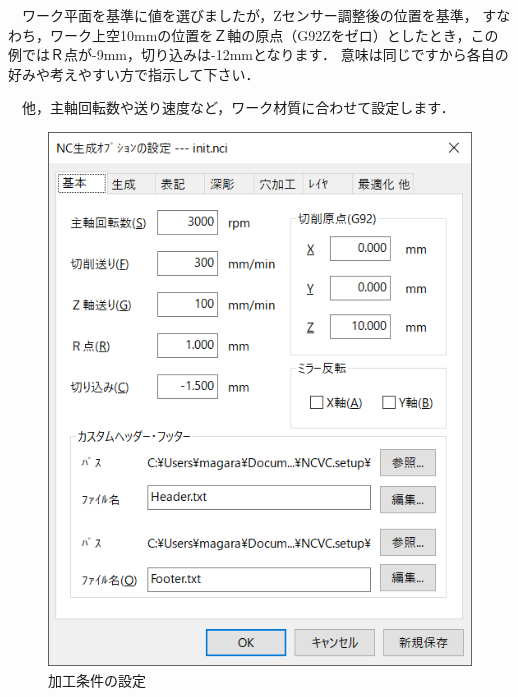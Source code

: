 　ワーク平面を基準に値を選びましたが，Zセンサー調整後の位置を基準，
すなわち，ワーク上空10mmの位置をＺ軸の原点（G92Zをゼロ）としたとき，この例ではＲ点が-9mm，切り込みは-12mmとなります．
意味は同じですから各自の好みや考えやすい方で指示して下さい．

　他，主軸回転数や送り速度など，ワーク材質に合わせて設定します．

\begin{minipage}{0.5\textwidth}
\begin{figure}[H]
\centering
\includegraphics[scale=0.7]{No1/fig/init.nci.png}
\caption{加工条件の設定}
\label{fig:init.nci.png}
\end{figure}
\end{minipage}
